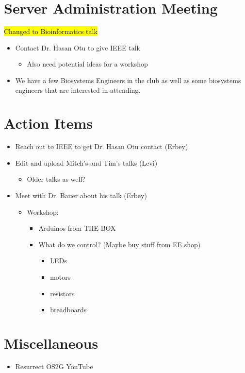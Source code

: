 \section*{Server Administration Meeting}
\hl{Changed to Bioinformatics talk}
    \begin{itemize}
         \item Contact Dr. Hasan Otu to give IEEE talk
         \begin{itemize}
             \item Also need potential ideas for a workshop
         \end{itemize}
         \item We have a few Biosystems Engineers in the club as well as some biosystems engineers that are interested in attending.
    \end{itemize}

\section*{Action Items}
    \begin{itemize}
        \item Reach out to IEEE to get Dr. Hasan Otu contact (Erbey)
        \item Edit and upload Mitch's and Tim's talks (Levi)
        \begin{itemize}
            \item Older talks as well?
        \end{itemize}
        \item Meet with Dr. Bauer about his talk (Erbey)
            \begin{itemize}
                \item Workshop:
                \begin{itemize}
                    \item Arduinos from THE BOX
                    \item What do we control? (Maybe buy stuff from EE shop)
                    \begin{itemize}
                        \item LEDs
                        \item motors
                        \item resistors
                        \item breadboards
                    \end{itemize}
                \end{itemize}
            \end{itemize}
    \end{itemize}

\section*{Miscellaneous}
    \begin{itemize}
        \item Resurrect OS2G YouTube
    \end{itemize}
